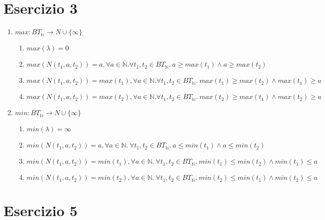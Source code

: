\documentclass{article}
\begin{document}
\section{Esercizio 3}
\begin{enumerate}
    \item \(max: BT_\mathbb{N} \rightarrow N \cup \{\infty\}\)
          \begin{enumerate}
              \item \(max(\lambda) = 0\)
              \item \(max(N(t_1, a, t_2)) = a, \forall a \in \mathbb{N} . \forall t_1,t_2 \in BT_\mathbb{N} .\ a \geq max(t_1) \land a \geq max(t_2)\)
              \item \(max(N(t_1, a, t_2)) = max(t_1), \forall a \in \mathbb{N} . \forall t_1,t_2 \in BT_\mathbb{N} .\ max(t_1) \geq max(t_2) \land max(t_1) \geq a\)
              \item \(max(N(t_1, a, t_2)) = max(t_2), \forall a \in \mathbb{N} . \forall t_1,t_2 \in BT_\mathbb{N} .\ max(t_2) \geq max(t_1) \land max(t_2) \geq a\)
          \end{enumerate}
    \item \(min: BT_\mathbb{N} \rightarrow N \cup \{\infty\}\)
          \begin{enumerate}
              \item \(min(\lambda) = \infty\)
              \item \(min(N(t_1, a, t_2)) = a, \forall a \in \mathbb{N} .\ \forall t_1,t_2 \in BT_\mathbb{N} .\ a \leq min(t_1) \land a \leq min(t_2)\)
              \item \(min(N(t_1, a, t_2)) = min(t_1), \forall a \in \mathbb{N} .\ \forall t_1,t_2 \in BT_\mathbb{N} .\ min(t_1) \leq min(t_2) \land min(t_1) \leq a\)
              \item \(min(N(t_1, a, t_2)) = min(t_2), \forall a \in \mathbb{N} .\ \forall t_1,t_2 \in BT_\mathbb{N} .\ min(t_2) \leq min(t_1) \land min(t_2) \leq a\)
          \end{enumerate}
\end{enumerate}

\section{Esercizio 5}
\end{document}
